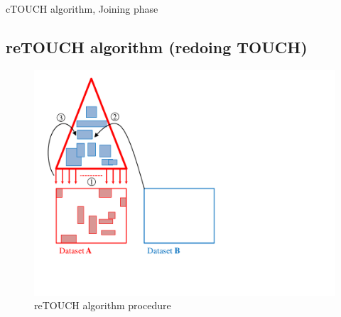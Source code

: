 \documentclass{vldb}
\newcommand{\SJ}{TOUCH}
\newcommand{\reSJ}{reTOUCH}
\begin{document}
\begin{algorithm}
\caption{cTOUCH algorithm, Joining phase}
\label{alg:cTOUCHj}
\begin{algorithmic}[1]
	\If{$\textcolor{blue}{o} \cap \textcolor{red}{o} \neq \varnothing$}
	\EndIf
      \EndFor
    \EndFor
  \EndFor

	\If{$\textcolor{red}{o} \cap \textcolor{blue}{o} \neq \varnothing$}
	\EndIf
      \EndFor
    \EndFor
  \EndFor

      \If{$\textcolor{blue}{o} \cap \textcolor{red}{o} \neq \varnothing$}
      \EndIf
  \EndFor
\EndFor
\end{algorithmic}
\end{algorithm}

\subsection{{\reSJ} algorithm (redoing {\SJ})}

\begin{figure}[htb]
    \begin{center}
        \includegraphics[width=.8\columnwidth]{figures/ReTouch}
        \caption{{\reSJ} algorithm procedure}
        \label{fig:RETOUCH}
      \end{center}
\end{figure}
\end{document}
